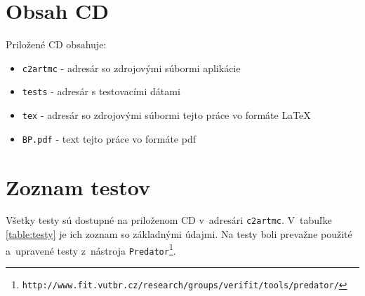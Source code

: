





\chapter{Obsah CD}
Priložené CD obsahuje:
\begin{itemize}
\item \texttt{c2artmc} - adresár so zdrojovými súbormi aplikácie
\item \texttt{tests} - adresár s testovacími dátami
\item \texttt{tex} - adresár so zdrojovými súbormi tejto práce vo formáte \LaTeX
\item \texttt{BP.pdf} - text tejto práce vo formáte pdf  
\end{itemize}

\chapter{Zoznam testov}
\label{priloha:testy}
Všetky testy sú dostupné na priloženom CD v~adresári \texttt{c2artmc}. V~tabuľke \ref{table:testy} je ich zoznam so základnými údajmi. Na testy boli prevažne použité a~upravené testy z~nástroja \texttt{Predator\footnote{http://www.fit.vutbr.cz/research/groups/verifit/tools/predator/}}.

